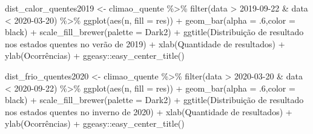 \documentclass[
]{article}
\newenvironment{Shaded}{\begin{snugshade}}{\end{snugshade}}
\newcommand{\AttributeTok}[1]{\textcolor[rgb]{0.77,0.63,0.00}{#1}}
\newcommand{\DecValTok}[1]{\textcolor[rgb]{0.00,0.00,0.81}{#1}}
\newcommand{\FunctionTok}[1]{\textcolor[rgb]{0.00,0.00,0.00}{#1}}
\newcommand{\NormalTok}[1]{#1}
\newcommand{\OtherTok}[1]{\textcolor[rgb]{0.56,0.35,0.01}{#1}}
\newcommand{\SpecialCharTok}[1]{\textcolor[rgb]{0.00,0.00,0.00}{#1}}
\newcommand{\StringTok}[1]{\textcolor[rgb]{0.31,0.60,0.02}{#1}}
\begin{document}
\begin{Shaded}
\begin{Highlighting}[]
\NormalTok{dist\_calor\_quentes2019 }\OtherTok{\textless{}{-}}\NormalTok{ climao\_quente }\SpecialCharTok{\%\textgreater{}\%} 
  \FunctionTok{filter}\NormalTok{(data }\SpecialCharTok{\textgreater{}} \StringTok{\textquotesingle{}2019{-}09{-}22\textquotesingle{}} \SpecialCharTok{\&}\NormalTok{ data }\SpecialCharTok{\textless{}} \StringTok{\textquotesingle{}2020{-}03{-}20\textquotesingle{}}\NormalTok{) }\SpecialCharTok{\%\textgreater{}\%}
  \FunctionTok{ggplot}\NormalTok{(}\FunctionTok{aes}\NormalTok{(n, }\AttributeTok{fill =}\NormalTok{ res)) }\SpecialCharTok{+} 
  \FunctionTok{geom\_bar}\NormalTok{(}\AttributeTok{alpha =}\NormalTok{ .}\DecValTok{6}\NormalTok{,}\AttributeTok{color =} \StringTok{\textquotesingle{}black\textquotesingle{}}\NormalTok{) }\SpecialCharTok{+} 
  \FunctionTok{scale\_fill\_brewer}\NormalTok{(}\AttributeTok{palette =} \StringTok{\textquotesingle{}Dark2\textquotesingle{}}\NormalTok{) }\SpecialCharTok{+}
  \FunctionTok{ggtitle}\NormalTok{(}\StringTok{\textquotesingle{}Distribuição de resultado nos estados quentes no verão de 2019\textquotesingle{}}\NormalTok{) }\SpecialCharTok{+}
  \FunctionTok{xlab}\NormalTok{(}\StringTok{\textquotesingle{}Quantidade de resultados\textquotesingle{}}\NormalTok{) }\SpecialCharTok{+} \FunctionTok{ylab}\NormalTok{(}\StringTok{\textquotesingle{}Ocorrências\textquotesingle{}}\NormalTok{) }\SpecialCharTok{+}
\NormalTok{  ggeasy}\SpecialCharTok{::}\FunctionTok{easy\_center\_title}\NormalTok{()}


\NormalTok{dist\_frio\_quentes2020 }\OtherTok{\textless{}{-}}\NormalTok{ climao\_quente }\SpecialCharTok{\%\textgreater{}\%} 
  \FunctionTok{filter}\NormalTok{(data }\SpecialCharTok{\textgreater{}} \StringTok{\textquotesingle{}2020{-}03{-}20\textquotesingle{}} \SpecialCharTok{\&}\NormalTok{ data }\SpecialCharTok{\textless{}} \StringTok{\textquotesingle{}2020{-}09{-}22\textquotesingle{}}\NormalTok{) }\SpecialCharTok{\%\textgreater{}\%}
  \FunctionTok{ggplot}\NormalTok{(}\FunctionTok{aes}\NormalTok{(n, }\AttributeTok{fill =}\NormalTok{ res)) }\SpecialCharTok{+} 
  \FunctionTok{geom\_bar}\NormalTok{(}\AttributeTok{alpha =}\NormalTok{ .}\DecValTok{6}\NormalTok{,}\AttributeTok{color =} \StringTok{\textquotesingle{}black\textquotesingle{}}\NormalTok{) }\SpecialCharTok{+} 
  \FunctionTok{scale\_fill\_brewer}\NormalTok{(}\AttributeTok{palette =} \StringTok{\textquotesingle{}Dark2\textquotesingle{}}\NormalTok{) }\SpecialCharTok{+}
  \FunctionTok{ggtitle}\NormalTok{(}\StringTok{\textquotesingle{}Distribuição de resultado nos estados quentes no inverno de 2020\textquotesingle{}}\NormalTok{) }\SpecialCharTok{+}
  \FunctionTok{xlab}\NormalTok{(}\StringTok{\textquotesingle{}Quantidade de resultados\textquotesingle{}}\NormalTok{) }\SpecialCharTok{+} \FunctionTok{ylab}\NormalTok{(}\StringTok{\textquotesingle{}Ocorrências\textquotesingle{}}\NormalTok{) }\SpecialCharTok{+}
\NormalTok{  ggeasy}\SpecialCharTok{::}\FunctionTok{easy\_center\_title}\NormalTok{() }


\end{Highlighting}
\end{Shaded}
\end{document}
